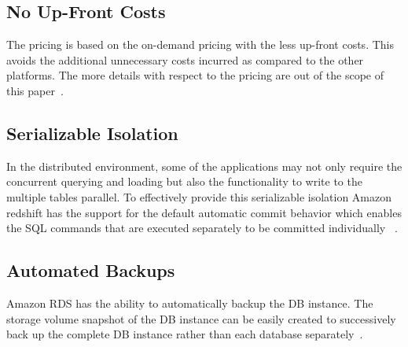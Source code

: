 	\subsection{No Up-Front Costs}
	The pricing is based on the on-demand pricing with the less up-front 
	costs. This avoids the additional unnecessary costs incurred as 
	compared to the other platforms. The more details with respect to 
	the pricing are out of the scope of 
	this paper~\cite{hid-sp18-412-Amazon_Redshift_Official_Page}.
        
    \subsection{Serializable Isolation}
     In the distributed environment, some of the applications may not only 
	 require the concurrent querying and loading but also the functionality 
	 to write to the multiple tables parallel. To effectively provide this 
	 serializable isolation Amazon redshift has the support for the default 
	 automatic commit behavior which enables the SQL commands that are 
	 executed separately to be committed 
	 individually
	 ~\cite{hid-sp18-412-Amazon_Redshift_Serializable_Isolation}.
		
	\subsection{Automated Backups}
    	Amazon RDS has the ability to automatically backup the DB instance. 
	The storage volume snapshot of the DB instance can be easily created 
	to successively back up the complete  DB instance rather than each 
	database separately~\cite{hid-sp18-412-Amazon_Redshift_Official_Page}.
   
